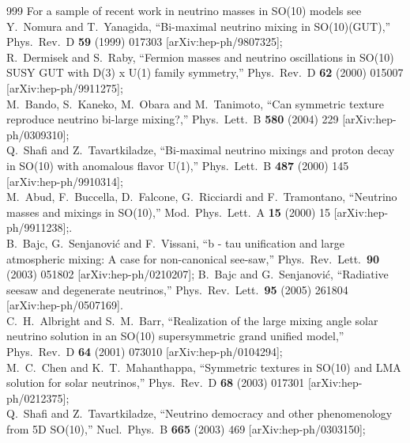 \begin{thebibliography}{999}
For a sample of recent work in neutrino masses  in SO(10) models see\\
  Y.~Nomura and T.~Yanagida,
  ``Bi-maximal neutrino mixing in SO(10)(GUT),''
  Phys.\ Rev.\ D {\bf 59} (1999) 017303
  [arXiv:hep-ph/9807325];
  \\
  R.~Dermisek and S.~Raby,
  ``Fermion masses and neutrino oscillations in SO(10) SUSY GUT with  D(3) x
  U(1) family symmetry,''
  Phys.\ Rev.\ D {\bf 62} (2000) 015007
  [arXiv:hep-ph/9911275];
  \\
  M.~Bando, S.~Kaneko, M.~Obara and M.~Tanimoto,
  ``Can symmetric texture reproduce neutrino bi-large mixing?,''
  Phys.\ Lett.\ B {\bf 580} (2004) 229
  [arXiv:hep-ph/0309310];
\\
  Q.~Shafi and Z.~Tavartkiladze,
  ``Bi-maximal neutrino mixings and proton decay in SO(10) with anomalous
  flavor U(1),''
  Phys.\ Lett.\ B {\bf 487} (2000) 145
  [arXiv:hep-ph/9910314];
\\
  M.~Abud, F.~Buccella, D.~Falcone, G.~Ricciardi and F.~Tramontano,
  ``Neutrino masses and mixings in SO(10),''
  Mod.\ Phys.\ Lett.\ A {\bf 15} (2000) 15
  [arXiv:hep-ph/9911238];.
\\
  B.~Bajc, G.~Senjanovi\' c and F.~Vissani,
  ``b - tau unification and large atmospheric mixing: A case for non-canonical
  see-saw,''
  Phys.\ Rev.\ Lett.\  {\bf 90} (2003) 051802
  [arXiv:hep-ph/0210207];
  B.~Bajc and G.~Senjanovi\' c,
  ``Radiative seesaw and degenerate neutrinos,''
  Phys.\ Rev.\ Lett.\  {\bf 95} (2005) 261804
  [arXiv:hep-ph/0507169].
\\
  C.~H.~Albright and S.~M.~Barr,
  ``Realization of the large mixing angle solar neutrino solution in an  SO(10)
  supersymmetric grand unified model,''
  Phys.\ Rev.\ D {\bf 64} (2001) 073010
  [arXiv:hep-ph/0104294];
\\
  M.~C.~Chen and K.~T.~Mahanthappa,
  ``Symmetric textures in SO(10) and LMA solution for solar neutrinos,''
  Phys.\ Rev.\ D {\bf 68} (2003) 017301
  [arXiv:hep-ph/0212375];
\\
  Q.~Shafi and Z.~Tavartkiladze,
  ``Neutrino democracy and other phenomenology from 5D SO(10),''
  Nucl.\ Phys.\ B {\bf 665} (2003) 469
  [arXiv:hep-ph/0303150];

\end{thebibliography}
